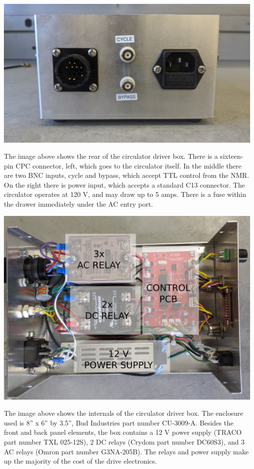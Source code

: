\documentclass{manual}
\begin{document}
\begin{center}
  \includegraphics[width=0.75\linewidth]{../pictures/2019-10-23_114434}
\end{center}

The image above shows the rear of the circulator driver box.
There is a sixteen-pin CPC connector, left, which goes to the circulator itself.
In the middle there are two BNC inputs, cycle and bypass, which accept TTL control from the NMR.
On the right there is power input, which accepts a standard C13 connector.
The circulator operates at 120 V, and may draw up to 5 amps.
There is a fuse within the drawer immediately under the AC entry port.

\clearpage

\begin{center}
  \includegraphics[width=\linewidth]{./figures/internal}
\end{center}

The image above shows the internals of the circulator driver box.
The enclosure used is 8'' x 6'' by 3.5'', Bud Industries part number CU-3009-A.
Besides the front and back panel elements, the box contains a 12 V power supply (TRACO part number  TXL 025-12S), 2 DC relays (Crydom part number DC60S3), and 3 AC relays (Omron part number G3NA-205B).
The relays and power supply make up the majority of the cost of the drive electronics.
\end{document}
